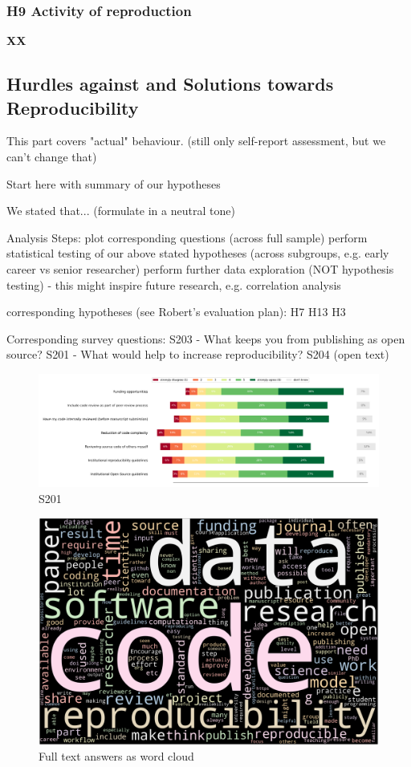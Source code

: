 \documentclass{article}
\begin{document}
\subsubsection{H9 Activity of reproduction}

\textbf{XX}

\subsection{Hurdles against and Solutions towards Reproducibility}

This part covers "actual" behaviour. (still only self-report assessment, but we can't change that)

    Start here with summary of our hypotheses

We stated that... (formulate in a neutral tone)

    Analysis Steps:
        plot corresponding questions (across full sample)
        perform statistical testing of our above stated hypotheses (across subgroups, e.g. early career vs senior researcher)
        perform further data exploration (NOT hypothesis testing) - this might inspire future research, e.g. correlation analysis

    corresponding hypotheses (see Robert's evaluation plan):
        H7
        H13
        H3

    Corresponding survey questions:
        S203 - What keeps you from publishing as open source?
        S201 - What would help to increase reproducibility?
        S204 (open text)

\begin{figure}[!p]
    \centering
    \includegraphics[width=\textwidth]{../figs/S201.png}
	\caption{S201 }
    \label{fig:S201}
\end{figure}

\begin{figure}[!p]
    \centering
    \includegraphics[width=\textwidth]{../word_cloud.png}
	\caption{Full text answers as word cloud }
    \label{fig:wc}
\end{figure}
\end{document}
